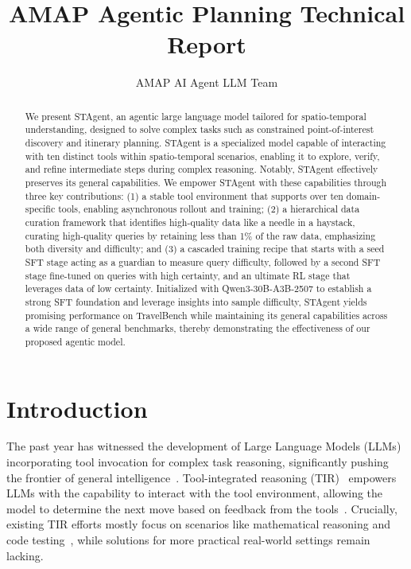 \documentclass{article} %
\title{AMAP Agentic Planning Technical Report}
\author{
  \centerline{AMAP AI Agent LLM Team}
}
\newcommand{\model}{STAgent\xspace}
\begin{document}
\maketitle

\begin{abstract}
We present \model, an agentic large language model tailored for spatio-temporal understanding, designed to solve complex tasks such as constrained point-of-interest discovery and itinerary planning. \model is a specialized model capable of interacting with ten distinct tools within spatio-temporal scenarios, enabling it to explore, verify, and refine intermediate steps during complex reasoning. Notably, \model effectively preserves its general capabilities. We empower \model with these capabilities through three key contributions: (1) a stable tool environment that supports over ten domain-specific tools, enabling asynchronous rollout and training; (2) a hierarchical data curation framework that identifies high-quality data like a needle in a haystack, curating high-quality queries by retaining less than 1\% of the raw data, emphasizing both diversity and difficulty; and (3) a cascaded training recipe that starts with a seed SFT stage acting as a guardian to measure query difficulty, followed by a second SFT stage fine-tuned on queries with high certainty, and an ultimate RL stage that leverages data of low certainty. Initialized with Qwen3-30B-A3B-2507 to establish a strong SFT foundation and leverage insights into sample difficulty, \model yields promising performance on TravelBench while maintaining its general capabilities across a wide range of general benchmarks, thereby demonstrating the effectiveness of our proposed agentic model.
\end{abstract}


\section{Introduction}
The past year has witnessed the development of Large Language Models (LLMs) incorporating tool invocation for complex task reasoning, significantly pushing the frontier of general intelligence~\cite{kimi_k2,glm_4.5,deepseek_v32,qwen3}. Tool-integrated reasoning (TIR)~\cite{qu2025tool} empowers LLMs with the capability to interact with the tool environment, allowing the model to determine the next move based on feedback from the tools~\cite{tir_tora,tir_search,arpo,rstar2agent}. Crucially, existing TIR efforts mostly focus on scenarios like mathematical reasoning and code testing~\cite{agentic_rl_survey,TIR_understand}, while solutions for more practical real-world settings remain lacking.
\end{document}
